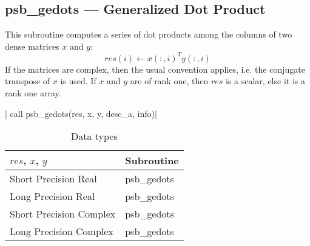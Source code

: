 %
%

\clearpage\subsection{psb\_gedots --- Generalized Dot Product}

This subroutine computes a series of  dot products among the columns of
two dense matrices  $x$ and $y$:
\[ res(i) \leftarrow x(:,i)^T y(:,i)\]
If the matrices are complex, then the
usual convention applies, i.e. the conjugate transpose of $x$ is
used. If $x$ and $y$ are of rank one, then $res$ is a scalar, else it
is a rank one array.

\fortinline| call psb_gedots(res, x, y, desc_a, info)|

\begin{table}[h]
\begin{center}
\begin{tabular}{ll}
\hline
$res$, $x$, $y$ & {\bf Subroutine}\\
\hline
Short Precision Real & psb\_gedots \\
Long Precision Real & psb\_gedots \\
Short Precision Complex & psb\_gedots \\
Long Precision Complex & psb\_gedots \\
\hline
\end{tabular}
\end{center}
\caption{Data types\label{tab:f90mdot}}
\end{table}

